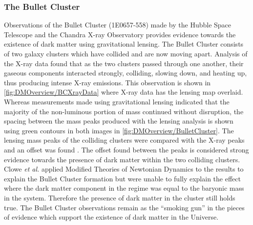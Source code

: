 \subsubsection{The Bullet Cluster}\label{sec:DMOverview/BulletCluster}
Observations of the Bullet Cluster (1E0657-558) made by the Hubble Space Telescope and the Chandra X-ray Observatory provides evidence towards the existence of dark matter using gravitational lensing.
The Bullet Cluster consists of two galaxy clusters which have collided and are now moving apart. 
Analysis of the X-ray data found that as the two clusters passed through one another, their gaseous components interacted strongly, colliding, slowing down, and heating up, thus producing intense X-ray emissions. This observation is shown in \autoref{fig:DMOverview/BCXrayData} where X-ray data has the lensing map overlaid.  Whereas measurements made using gravitational lensing indicated that the majority of the non-luminous portion of mass continued without disruption, the spacing between the mass peaks produced with the lensing analysis is shown using green contours in both images in \autoref{fig:DMOverview/BulletCluster}. The lensing mass peaks of the colliding clusters were compared with the X-ray peaks and an offset was found \cite{Clowe_2004}. The offset found between the peaks is considered strong evidence towards the presence of dark matter within the two colliding clusters. Clowe \textit{et al.}\cite{Clowe2006} applied Modified Theories of Newtonian Dynamics to the results to explain the Bullet Cluster formation but were unable to fully explain the effect where the dark matter component in the regime was equal to the baryonic mass in the system. Therefore the presence of dark matter in the cluster still holds true. The Bullet Cluster observations remain as the ``smoking gun'' in the pieces of evidence which support the existence of dark matter in the Universe.
